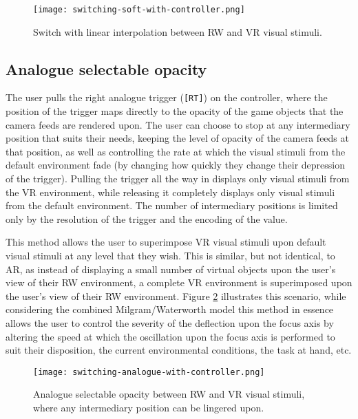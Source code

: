\begin{figure}[h]
	\begin{center}
		\texttt{[image: switching-soft-with-controller.png]}
		\caption{Switch with linear interpolation between RW and VR visual stimuli.}
		\label{scenario12}
	\end{center}
\end{figure}


\subsection{Analogue selectable opacity}
\label{analogue-selectable-opacity}
The user pulls the right analogue trigger (\texttt{[RT]}) on the controller, where the position of the trigger maps directly to the opacity of the game objects that the camera feeds are rendered upon. The user can choose to stop at any intermediary position that suits their needs, keeping the level of opacity of the camera feeds at that position, as well as controlling the rate at which the visual stimuli from the default environment fade (by changing how quickly they change their depression of the trigger). Pulling the trigger all the way in displays only visual stimuli from the VR environment, while releasing it completely displays only visual stimuli from the default environment. The number of intermediary positions is limited only by the resolution of the trigger and the encoding of the value.

This method allows the user to superimpose VR visual stimuli upon default visual stimuli at any level that they wish. This is similar, but not identical, to AR, as instead of displaying a small number of virtual objects upon the user's view of their RW environment, a complete VR environment is superimposed upon the user's view of their RW environment. Figure \ref{scenario2} illustrates this scenario, while considering the combined Milgram/Waterworth model this method in essence allows the user to control the severity of the deflection upon the focus axis by altering the speed at which the oscillation upon the focus axis is performed to suit their disposition, the current environmental conditions, the task at hand, etc.

\begin{figure}[h]
	\begin{center}
		\texttt{[image: switching-analogue-with-controller.png]}
		\caption{Analogue selectable opacity between RW and VR visual stimuli, where any intermediary position can be lingered upon.}
		\label{scenario2}
	\end{center}
\end{figure}

